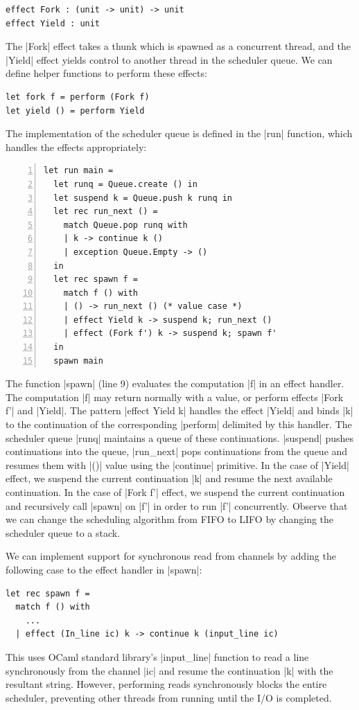 \documentclass[sigplan,screen]{acmart}
\begin{document}
\begin{lstlisting}
effect Fork : (unit -> unit) -> unit
effect Yield : unit
\end{lstlisting}

The |Fork| effect takes a thunk which is spawned as a concurrent thread, and
the |Yield| effect yields control to another thread in the scheduler queue. We
can define helper functions to perform these effects:

\begin{lstlisting}
let fork f = perform (Fork f)
let yield () = perform Yield
\end{lstlisting}

The implementation of the scheduler queue is defined in the |run| function,
which handles the effects appropriately:

\begin{lstlisting}[numbers=left]
let run main =
  let runq = Queue.create () in
  let suspend k = Queue.push k runq in
  let rec run_next () =
    match Queue.pop runq with
    | k -> continue k ()
    | exception Queue.Empty -> ()
  in
  let rec spawn f =
    match f () with
    | () -> run_next () (* value case *)
    | effect Yield k -> suspend k; run_next ()
    | effect (Fork f') k -> suspend k; spawn f'
  in
  spawn main
\end{lstlisting}

The function |spawn| (line 9) evaluates the computation |f| in an effect
handler. The computation |f| may return normally with a value, or perform
effects |Fork f'| and |Yield|. The pattern |effect Yield k| handles the effect
|Yield| and binds |k| to the continuation of the corresponding |perform|
delimited by this handler. The scheduler queue |runq| maintains a queue of
these continuations. |suspend| pushes continuations into the queue, |run_next|
pops continuations from the queue and resumes them with |()| value using the
|continue| primitive. In the case of |Yield| effect, we suspend the current
continuation |k| and resume the next available continuation. In the case of
|Fork f'| effect, we suspend the current continuation and recursively call
|spawn| on |f'| in order to run |f'| concurrently. Observe that we can change
the scheduling algorithm from FIFO to LIFO by changing the scheduler queue to a
stack.

We can implement support for synchronous read from channels by adding the
following case to the effect handler in |spawn|:

\begin{lstlisting}
let rec spawn f =
  match f () with
	...
  | effect (In_line ic) k -> continue k (input_line ic)
\end{lstlisting}
%
This uses OCaml standard library's |input_line| function to read a line
synchronously from the channel |ic| and resume the continuation |k| with the
resultant string. However, performing reads synchronously blocks the entire
scheduler, preventing other threads from running until the I/O is completed.
\end{document}
